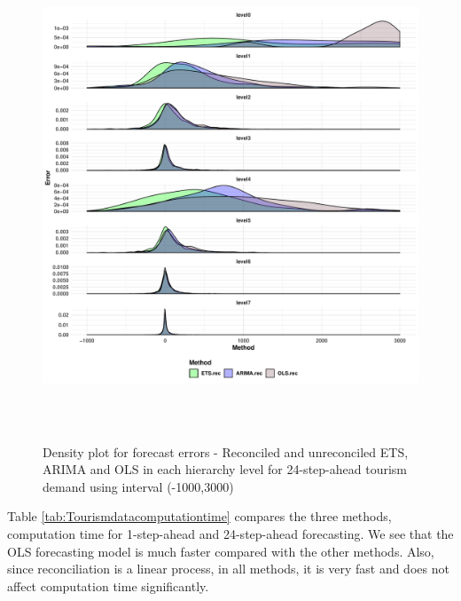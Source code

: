 \documentclass[11pt,a4paper,]{article}
\begin{document}
\begin{figure}

{\centering \includegraphics[width=450px,height=550px]{Paper-Figures/results_Tourism/densityplot_24} 

}

\caption{Density plot for forecast errors -  Reconciled and unreconciled ETS, ARIMA and OLS in each hierarchy level for 24-step-ahead tourism demand using interval (-1000,3000)}\label{fig:densityplottourism}
\end{figure}

Table \ref{tab:Tourismdatacomputationtime} compares the three methods,
computation time for 1-step-ahead and 24-step-ahead forecasting. We see
that the OLS forecasting model is much faster compared with the other
methods. Also, since reconciliation is a linear process, in all methods,
it is very fast and does not affect computation time significantly.
\end{document}
